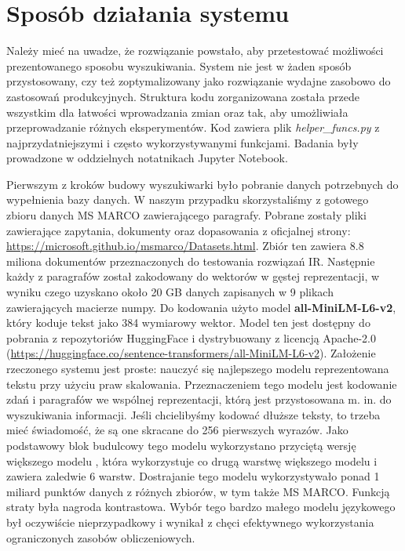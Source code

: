 \section{Sposób działania systemu}
Należy mieć na uwadze, że rozwiązanie powstało, aby przetestować możliwości prezentowanego sposobu wyszukiwania. System nie jest w żaden sposób przystosowany, czy też zoptymalizowany jako rozwiązanie wydajne zasobowo do zastosowań produkcyjnych. Struktura kodu zorganizowana została przede wszystkim dla łatwości wprowadzania zmian oraz tak, aby umożliwiała przeprowadzanie różnych eksperymentów. Kod zawiera plik \emph{helper\_funcs.py} z najprzydatniejszymi i często wykorzystywanymi funkcjami. Badania były prowadzone w oddzielnych notatnikach Jupyter Notebook.\newline

Pierwszym z kroków budowy wyszukiwarki było pobranie danych potrzebnych do wypełnienia bazy danych. W naszym przypadku skorzystaliśmy z gotowego zbioru danych MS MARCO zawierającego paragrafy. Pobrane zostały pliki zawierające zapytania, dokumenty oraz dopasowania z oficjalnej strony: \url{https://microsoft.github.io/msmarco/Datasets.html}. Zbiór ten zawiera 8.8 miliona dokumentów przeznaczonych do testowania rozwiązań IR. Następnie każdy z paragrafów został zakodowany do wektorów w gęstej reprezentacji, w wyniku czego uzyskano około 20 GB danych zapisanych w 9 plikach zawierających macierze numpy. Do kodowania użyto model \textbf{all-MiniLM-L6-v2}, który koduje tekst jako 384 wymiarowy wektor. Model ten jest dostępny do pobrania z repozytoriów HuggingFace i dystrybuowany z licencją Apache-2.0 (\url{https://huggingface.co/sentence-transformers/all-MiniLM-L6-v2}). Założenie rzeczonego systemu jest proste: nauczyć się najlepszego modelu reprezentowana tekstu przy użyciu praw skalowania. Przeznaczeniem tego modelu jest kodowanie zdań i paragrafów we wspólnej reprezentacji, którą jest przystosowana m. in. do wyszukiwania informacji. Jeśli chcielibyśmy kodować dłuższe teksty, to trzeba mieć świadomość, że są one skracane do 256 pierwszych wyrazów. Jako podstawowy blok budulcowy tego modelu wykorzystano przyciętą wersję większego modelu , która wykorzystuje co drugą warstwę większego modelu i zawiera zaledwie 6 warstw. Dostrajanie tego modelu wykorzystywało ponad 1 miliard punktów danych z różnych zbiorów, w tym także MS MARCO. Funkcją straty była nagroda kontrastowa. Wybór tego bardzo małego modelu językowego był oczywiście nieprzypadkowy i wynikał z chęci efektywnego wykorzystania ograniczonych zasobów obliczeniowych.\newline

